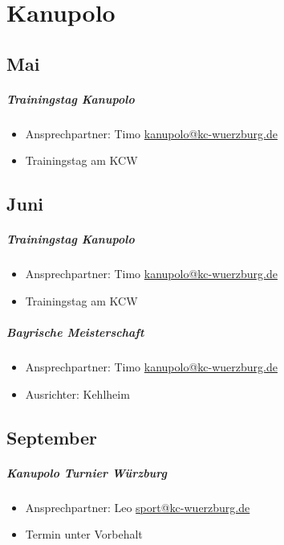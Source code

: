 \documentclass[12pt, a4paper]{report}
\begin{document}
\chapter*{Kanupolo}
\thispagestyle{Kanupolo}
\pagestyle{Kanupolo}
\section*{Mai}\paragraph{Trainingstag Kanupolo}
\begin{itemize}
    \item Ansprechpartner: Timo \href{mailto:kanupolo@kc-wuerzburg.de}{kanupolo@kc-wuerzburg.de}
    \item Trainingstag am KCW
\end{itemize}

\section*{Juni}\paragraph{Trainingstag Kanupolo}
\begin{itemize}
    \item Ansprechpartner: Timo \href{mailto:kanupolo@kc-wuerzburg.de}{kanupolo@kc-wuerzburg.de}
    \item Trainingstag am KCW
\end{itemize}

\paragraph{Bayrische Meisterschaft}
\begin{itemize}
    \item Ansprechpartner: Timo \href{mailto:kanupolo@kc-wuerzburg.de}{kanupolo@kc-wuerzburg.de}
    \item Ausrichter: Kehlheim
\end{itemize}

\section*{September}\paragraph{Kanupolo Turnier Würzburg}
\begin{itemize}
    \item Ansprechpartner: Leo \href{mailto:sport@kc-wuerzburg.de}{sport@kc-wuerzburg.de}
    \item Termin unter Vorbehalt
\end{itemize}
\end{document}
